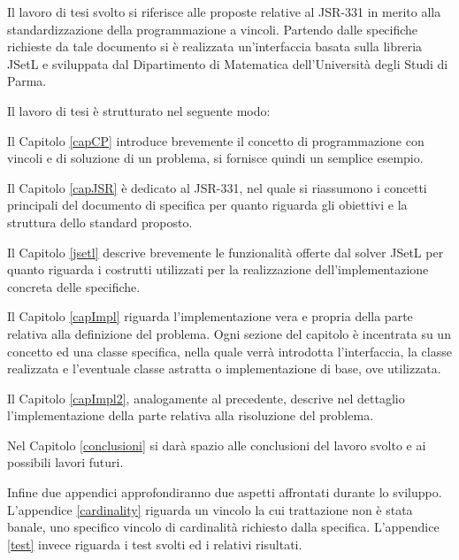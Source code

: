 Il lavoro di tesi svolto si riferisce alle proposte relative al
JSR-331 in merito alla standardizzazione della programmazione a vincoli.
Partendo dalle specifiche richieste da tale documento si è realizzata 
un'interfaccia basata sulla libreria JSetL e sviluppata dal 
Dipartimento di Matematica dell'Università degli Studi di Parma.

Il lavoro di tesi è strutturato nel seguente modo:

Il Capitolo \ref{capCP} introduce brevemente il concetto di programmazione
con vincoli e di soluzione di un problema, si fornisce quindi un semplice 
esempio.

Il Capitolo \ref{capJSR} è dedicato al JSR-331, nel quale si 
riassumono i concetti principali del documento di specifica per quanto riguarda
gli obiettivi e la struttura dello standard proposto.

Il Capitolo \ref{jsetl} descrive brevemente le funzionalità offerte dal solver
JSetL per quanto riguarda i costrutti utilizzati per la realizzazione
dell'implementazione concreta delle specifiche.

Il Capitolo \ref{capImpl} riguarda l'implementazione vera e propria della parte
relativa alla definizione del problema. Ogni sezione del capitolo
è incentrata su un concetto ed una classe specifica, nella quale verrà 
introdotta
l'interfaccia, la classe realizzata e l'eventuale classe astratta
o implementazione di base, ove utilizzata.

Il Capitolo \ref{capImpl2}, analogamente al precedente, descrive nel dettaglio
l'implementazione della parte  relativa alla risoluzione del problema.

Nel Capitolo \ref{conclusioni} si darà spazio alle conclusioni del lavoro svolto
e ai possibili lavori futuri.

Infine due appendici approfondiranno due aspetti affrontati
durante lo sviluppo. L'appendice \ref{cardinality} riguarda un vincolo la cui
trattazione non è stata banale, uno specifico vincolo di cardinalità richiesto
dalla specifica. L'appendice \ref{test}
invece riguarda i test svolti ed i relativi risultati.
